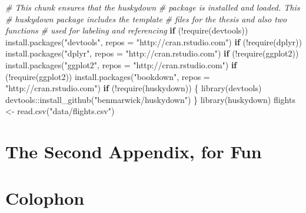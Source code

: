 \documentclass[print]{nuthesis}
\newenvironment{Shaded}{\begin{snugshade}}{\end{snugshade}}
\newcommand{\AttributeTok}[1]{\textcolor[rgb]{0.77,0.63,0.00}{#1}}
\newcommand{\CommentTok}[1]{\textcolor[rgb]{0.56,0.35,0.01}{\textit{#1}}}
\newcommand{\ControlFlowTok}[1]{\textcolor[rgb]{0.13,0.29,0.53}{\textbf{#1}}}
\newcommand{\FunctionTok}[1]{\textcolor[rgb]{0.00,0.00,0.00}{#1}}
\newcommand{\NormalTok}[1]{#1}
\newcommand{\OtherTok}[1]{\textcolor[rgb]{0.56,0.35,0.01}{#1}}
\newcommand{\SpecialCharTok}[1]{\textcolor[rgb]{0.00,0.00,0.00}{#1}}
\newcommand{\StringTok}[1]{\textcolor[rgb]{0.31,0.60,0.02}{#1}}
\begin{document}
\begin{Shaded}
\begin{Highlighting}[]
\CommentTok{\# This chunk ensures that the huskydown}
\CommentTok{\# package is installed and loaded. This}
\CommentTok{\# huskydown package includes the template}
\CommentTok{\# files for the thesis and also two functions}
\CommentTok{\# used for labeling and referencing}
\ControlFlowTok{if}\NormalTok{ (}\SpecialCharTok{!}\FunctionTok{require}\NormalTok{(devtools)) }\FunctionTok{install.packages}\NormalTok{(}\StringTok{"devtools"}\NormalTok{, }
    \AttributeTok{repos =} \StringTok{"http://cran.rstudio.com"}\NormalTok{)}
\ControlFlowTok{if}\NormalTok{ (}\SpecialCharTok{!}\FunctionTok{require}\NormalTok{(dplyr)) }\FunctionTok{install.packages}\NormalTok{(}\StringTok{"dplyr"}\NormalTok{, }
    \AttributeTok{repos =} \StringTok{"http://cran.rstudio.com"}\NormalTok{)}
\ControlFlowTok{if}\NormalTok{ (}\SpecialCharTok{!}\FunctionTok{require}\NormalTok{(ggplot2)) }\FunctionTok{install.packages}\NormalTok{(}\StringTok{"ggplot2"}\NormalTok{, }
    \AttributeTok{repos =} \StringTok{"http://cran.rstudio.com"}\NormalTok{)}
\ControlFlowTok{if}\NormalTok{ (}\SpecialCharTok{!}\FunctionTok{require}\NormalTok{(ggplot2)) }\FunctionTok{install.packages}\NormalTok{(}\StringTok{"bookdown"}\NormalTok{, }
    \AttributeTok{repos =} \StringTok{"http://cran.rstudio.com"}\NormalTok{)}
\ControlFlowTok{if}\NormalTok{ (}\SpecialCharTok{!}\FunctionTok{require}\NormalTok{(huskydown)) \{}
    \FunctionTok{library}\NormalTok{(devtools)}
\NormalTok{    devtools}\SpecialCharTok{::}\FunctionTok{install\_github}\NormalTok{(}\StringTok{"benmarwick/huskydown"}\NormalTok{)}
\NormalTok{\}}
\FunctionTok{library}\NormalTok{(huskydown)}
\NormalTok{flights }\OtherTok{\textless{}{-}} \FunctionTok{read.csv}\NormalTok{(}\StringTok{"data/flights.csv"}\NormalTok{)}
\end{Highlighting}
\end{Shaded}

\hypertarget{the-second-appendix-for-fun}{%
\chapter{The Second Appendix, for Fun}\label{the-second-appendix-for-fun}}

\hypertarget{colophon}{%
\chapter*{Colophon}\label{colophon}}
\end{document}
